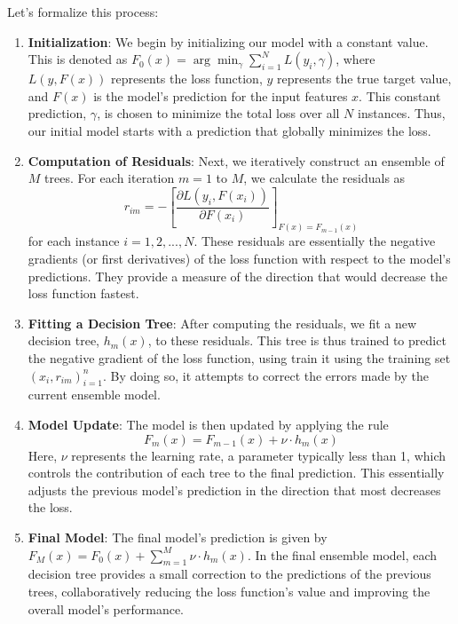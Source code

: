 Let's formalize this process:

\begin{enumerate}
	\item \textbf{Initialization}: We begin by initializing our model with a constant value. This is denoted as $F_0(x) = \arg\min_{\gamma} \sum_{i=1}^{N} L(y_i, \gamma)$, where $L(y, F(x))$ represents the loss function, $y$ represents the true target value, and $F(x)$ is the model's prediction for the input features $x$. This constant prediction, $\gamma$, is chosen to minimize the total loss over all $N$ instances. Thus, our initial model starts with a prediction that globally minimizes the loss.
	\item \textbf{Computation of Residuals}: Next, we iteratively construct an ensemble of $M$ trees. For each iteration $m=1$ to $M$, we calculate the residuals as
	\begin{equation}
		r_{im} = - \left[\frac{\partial L(y_i, F(x_i))}{\partial F(x_i)}\right]_{F(x)=F_{m-1}(x)}
	\end{equation} 
 	for each instance $i=1,2,...,N$. These residuals are essentially the negative gradients (or first derivatives) of the loss function with respect to the model's predictions. They provide a measure of the direction that would decrease the loss function fastest.
	\item \textbf{Fitting a Decision Tree}: After computing the residuals, we fit a new decision tree, $h_m(x)$, to these residuals. This tree is thus trained to predict the negative gradient of the loss function, using train it using the training set 
	${(x_i, r_{im})}_{i=1}^n$. By doing so, it attempts to correct the errors made by the current ensemble model.
	\item \textbf{Model Update}: The model is then updated by applying the rule
	\begin{equation}
		F_m(x) = F_{m-1}(x) + \nu \cdot h_m(x)
	\end{equation}
 	Here, $\nu$ represents the learning rate, a parameter typically less than 1, which controls the contribution of each tree to the final prediction. This essentially adjusts the previous model's prediction in the direction that most decreases the loss.
	\item \textbf{Final Model}: The final model's prediction is given by $F_M(x) = F_0(x) + \sum_{m=1}^{M} \nu \cdot h_m(x)$. In the final ensemble model, each decision tree provides a small correction to the predictions of the previous trees, collaboratively reducing the loss function's value and improving the overall model's performance.
\end{enumerate}


